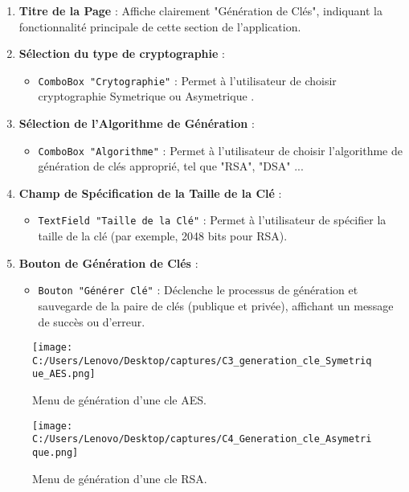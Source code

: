 \documentclass[a4paper,12pt]{report}
\begin{document}
\begin{enumerate}
	\item \textbf{Titre de la Page} : Affiche clairement "Génération de Clés", indiquant la fonctionnalité principale de cette section de l'application.
	
		\item \textbf{Sélection du type de cryptographie} :
	\begin{itemize}
			\item \texttt{ComboBox "Crytographie"} : Permet à l'utilisateur de choisir cryptographie Symetrique ou Asymetrique  .
		\end{itemize}
	
	\item \textbf{Sélection de l'Algorithme de Génération} : 
	\begin{itemize}
		\item \texttt{ComboBox "Algorithme"} : Permet à l'utilisateur de choisir l'algorithme de génération de clés approprié, tel que "RSA", "DSA" ...
	\end{itemize}
	
	\item \textbf{Champ de Spécification de la Taille de la Clé} : 
	\begin{itemize}
		\item \texttt{TextField "Taille de la Clé"} : Permet à l'utilisateur de spécifier la taille de la clé (par exemple, 2048 bits pour RSA).
	\end{itemize}
	
	\item \textbf{Bouton de Génération de Clés} : 
	\begin{itemize}
		\item \texttt{Bouton "Générer Clé"} : Déclenche le processus de génération et sauvegarde de la paire de clés (publique et privée), affichant un message de succès ou d'erreur.
	\end{itemize}
	

\end{enumerate}


	
	
	\begin{figure}[h!]
		\centering
		\texttt{[image: C:/Users/Lenovo/Desktop/captures/C3\_generation\_cle\_Symetrique\_AES.png]}
		\caption{Menu de génération d'une cle AES.}
	\end{figure}
	
	
		\begin{figure}[h]
		\centering
		\texttt{[image: C:/Users/Lenovo/Desktop/captures/C4\_Generation\_cle\_Asymetrique.png]}
		\caption{Menu de génération d'une cle RSA.}
	\end{figure}
	
\end{document}
